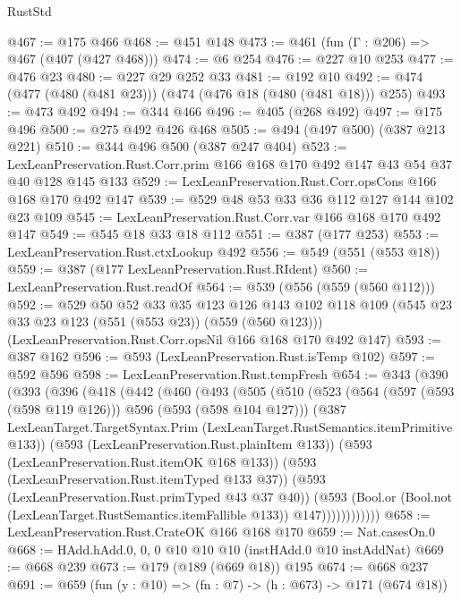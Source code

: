 \begin{lexlean}{RustStd}
\begin{coremodule}
@467 := @175 @466
@468 := @451 @148
@473 := @461 (fun (Γ : @206) => @467 (@407 (@427 @468)))
@474 := @6 @254
@476 := @227 @10 @253
@477 := @476 @23
@480 := @227 @29 @252 @33
@481 := @192 @10
@492 := @474 (@477 (@480 (@481 @23))) (@474 (@476 @18 (@480 (@481 @18))) @255)
@493 := @473 @492
@494 := @344 @466
@496 := @405 (@268 @492)
@497 := @175 @496
@500 := @275 @492 @426 @468
@505 := @494 (@497 @500) (@387 @213 @221)
@510 := @344 @496 @500 (@387 @247 @404)
@523 := LexLeanPreservation.Rust.Corr.prim @166 @168 @170 @492 @147 @43 @54 @37 @40 @128 @145 @133
@529 := LexLeanPreservation.Rust.Corr.opsCons @166 @168 @170 @492 @147
@539 := @529 @48 @53 @33 @36 @112 @127 @144 @102 @23 @109
@545 := LexLeanPreservation.Rust.Corr.var @166 @168 @170 @492 @147
@549 := @545 @18 @33 @18 @112
@551 := @387 (@177 @253)
@553 := LexLeanPreservation.Rust.ctxLookup @492
@556 := @549 (@551 (@553 @18))
@559 := @387 (@177 LexLeanPreservation.Rust.RIdent)
@560 := LexLeanPreservation.Rust.readOf
@564 := @539 (@556 (@559 (@560 @112)))
@592 := @529
    @50
    @52
    @33
    @35
    @123
    @126
    @143
    @102
    @118
    @109
    (@545 @23 @33 @23 @123 (@551 (@553 @23)) (@559 (@560 @123)))
    (LexLeanPreservation.Rust.Corr.opsNil @166 @168 @170 @492 @147)
@593 := @387 @162
@596 := @593 (LexLeanPreservation.Rust.isTemp @102)
@597 := @592 @596
@598 := LexLeanPreservation.Rust.tempFresh
@654 := @343
    (@390
      (@393
        (@396
          (@418
            (@442
              (@460
                (@493
                  (@505
                    (@510
                      (@523
                        (@564 (@597 (@593 (@598 @119 @126))) @596 (@593 (@598 @104 @127)))
                        (@387
                          LexLeanTarget.TargetSyntax.Prim
                          (LexLeanTarget.RustSemantics.itemPrimitive @133))
                        (@593 (LexLeanPreservation.Rust.plainItem @133))
                        (@593 (LexLeanPreservation.Rust.itemOK @168 @133))
                        (@593 (LexLeanPreservation.Rust.itemTyped @133 @37))
                        (@593 (LexLeanPreservation.Rust.primTyped @43 @37 @40))
                        (@593
                          (Bool.or
                            (Bool.not (LexLeanTarget.RustSemantics.itemFallible @133))
                            @147))))))))))))
@658 := LexLeanPreservation.Rust.CrateOK @166 @168 @170
@659 := Nat.casesOn.{0}
@668 := HAdd.hAdd.{0, 0, 0} @10 @10 @10 (instHAdd.{0} @10 instAddNat)
@669 := @668 @239
@673 := @179 (@189 (@669 @18)) @195
@674 := @668 @237
@691 := @659
    (fun (y : @10) => (fn : @7) -> (h : @673) -> @171 (@674 @18))

\end{coremodule}
\end{lexlean}
